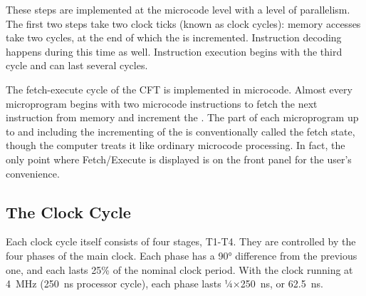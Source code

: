 These steps are implemented at the microcode level with a level of
parallelism. The first two steps take two clock ticks (known as
clock cycles): memory accesses take two cycles, at the end of
which the \PC{} is incremented. Instruction decoding happens during
this time as well. Instruction execution begins with the third cycle
and can last several cycles.

The fetch-execute cycle of the CFT is implemented in microcode. Almost
every microprogram begins with two microcode instructions to fetch the
next instruction from memory and increment the \PC. The part of each
microprogram up to and including the incrementing of the \PC{} is
conventionally called the fetch state, though the computer treats it
like ordinary microcode processing. In fact, the only point where
Fetch/Execute is displayed is on the front panel for the user's
convenience.

\subsection{The Clock Cycle}

Each clock cycle itself consists of four stages, T1-T4. They are
controlled by the four phases of the main clock. Each phase has a 90°
difference from the previous one, and each lasts 25\% of the nominal
clock period. With the clock running at 4~MHz (250~ns processor
cycle), each phase lasts ¼×250~ns, or 62.5~ns.

